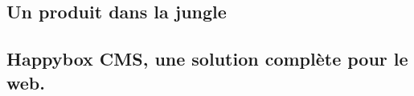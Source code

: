\documentclass[11pt, a4paper ]{article}
\let\stdsection\section
\renewcommand\section{\newpage\stdsection}
\begin{document}
\begin{spacing}{1.5}










		\section{Un produit dans la jungle} %

			\subsection{Happybox CMS, une solution complète pour le web.}


\end{spacing}
\end{document}
